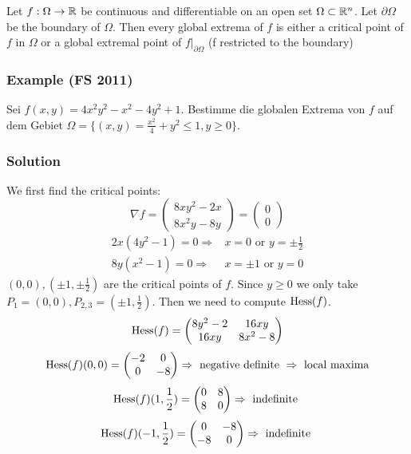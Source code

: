\documentclass[a4paper]{article}
\begin{document}
\begin{fact}{}
Let $f:\Omega \rightarrow \mathbb{R}$ be continuous and differentiable on an open set $\Omega \subset \mathbb{R}^n$. Let $\partial \Omega$ be the boundary of $\Omega$. Then every global extrema of $f$ is either a critical point of $f$ in $\Omega$ or a global extremal point of $f|_{\partial \Omega}$ (f restricted to the boundary)
\end{fact}

\subsubsection*{Example (FS 2011)}
Sei $f(x,y)=4x^2y^2-x^2-4y^2+1$. Bestimme die globalen Extrema von $f$ auf dem Gebiet $\Omega=\{(x,y)=\frac{x^2}{4}+y^2\leq 1, y\geq0\}$.
\subsubsection*{Solution}
We first find the critical points:
$$\nabla f=\begin{pmatrix} 8xy^2-2x \\ 8x^2y-8y \end{pmatrix} =  \begin{pmatrix}
0 \\ 
0
\end{pmatrix} $$
\begin{align*}
2x(4y^2-1)=0 \Rightarrow & x=0 \mbox{ or } y=\pm \frac{1}{2} \\
8y(x^2-1)=0 \Rightarrow & x=\pm 1 \mbox{ or } y=0
\end{align*}
$(0,0), (\pm 1, \pm \frac{1}{2})$ are the critical points of $f$. Since $y\geq 0$ we only take $P_1=(0,0), P_{2,3}=(\pm 1, \frac{1}{2})$. Then we need to compute $\operatorname{Hess}(f)$.
$$\operatorname{Hess}(f)=\begin{pmatrix}
8y^2-2 & 16xy \\ 
16xy & 8x^2-8
\end{pmatrix} $$
$$\operatorname{Hess}(f)(0,0)=\begin{pmatrix}
-2 & 0 \\ 
0 & -8
\end{pmatrix} \Rightarrow \mbox{ negative definite } \Rightarrow \mbox{ local maxima}$$ 
$$\operatorname{Hess}(f)(1,\frac{1}{2})=\begin{pmatrix}
0 & 8 \\ 
8 & 0
\end{pmatrix} \Rightarrow \mbox{ indefinite }$$ 
$$\operatorname{Hess}(f)(-1,\frac{1}{2})=\begin{pmatrix}
0 & -8 \\ 
-8 & 0
\end{pmatrix} \Rightarrow \mbox{ indefinite }$$ 
\end{document}
